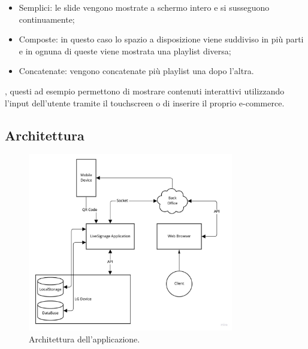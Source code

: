 \begin{itemize}
    \item Semplici: le slide vengono mostrate a schermo intero e si susseguono continuamente;
    \item Composte: in questo caso lo spazio a disposizione viene suddiviso in più parti e in ognuna di queste viene mostrata una playlist diversa;
    \item Concatenate: vengono concatenate più playlist una dopo l'altra.
\end{itemize}

, questi ad esempio permettono di  mostrare contenuti interattivi utilizzando l'input dell'utente tramite il touchscreen o di inserire il proprio e-commerce.

\subsection{Architettura}
\begin{figure}[!htb]
    \centering
    \includegraphics[width= 0.8\textwidth]{images/Introduzione/architettura.jpg} 
    \caption{Architettura dell'applicazione.} 
    \label{fig:architettura}
\end{figure}


